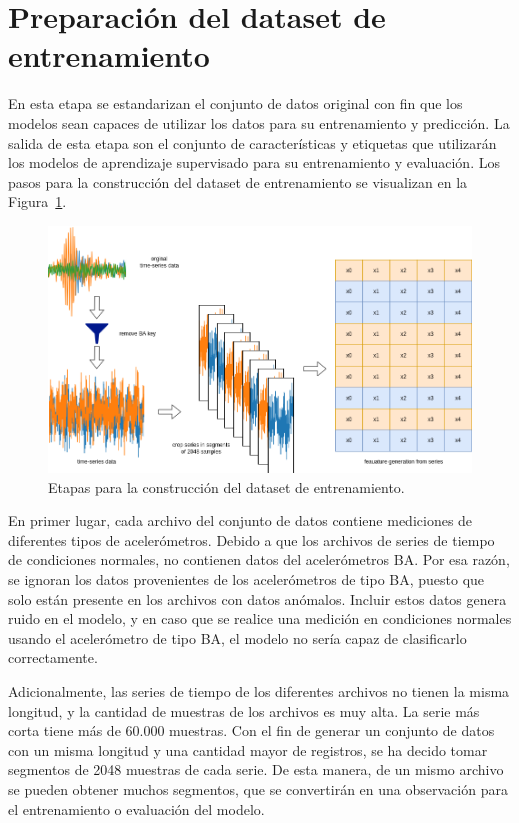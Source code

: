 \documentclass[11pt,a4paper,spanish]{book}
\numberwithin{equation}{chapter}
\numberwithin{figure}{chapter}
\begin{document}
\section{Preparación del dataset de entrenamiento}

En esta etapa se estandarizan el conjunto de datos original con fin que los modelos sean capaces de utilizar los datos para su entrenamiento y predicción. La salida de esta etapa son el conjunto de características y etiquetas que utilizarán los modelos de aprendizaje supervisado para su entrenamiento y evaluación. Los pasos para la construcción del dataset de entrenamiento se visualizan en la Figura~\ref{fig:figGenerationDataset}.


\begin{figure}[h]
    \centering
    \includegraphics[width=1\textwidth]{media/generacion-dataset.drawio.png}
    \caption{Etapas para la construcción del dataset de entrenamiento.}
    \label{fig:figGenerationDataset}
\end{figure}


En primer lugar, cada archivo del conjunto de datos contiene mediciones de diferentes tipos de acelerómetros. Debido a que los archivos de series de tiempo de condiciones normales, no contienen datos del acelerómetros BA. Por esa razón, se ignoran los datos provenientes de los acelerómetros de tipo BA, puesto que solo están presente en los archivos con datos anómalos. Incluir estos datos genera ruido en el modelo, y en caso que se realice una medición en condiciones normales usando el acelerómetro de tipo BA, el modelo no sería capaz de clasificarlo correctamente.


Adicionalmente, las series de tiempo de los diferentes archivos no tienen la misma longitud, y la cantidad de muestras de los archivos es muy alta. La serie más corta tiene más de 60.000 muestras. Con el fin de generar un conjunto de datos con un misma longitud y una cantidad mayor de registros, se ha decido tomar segmentos de 2048 muestras de cada serie.  De esta manera, de un mismo archivo se pueden obtener muchos segmentos, que se convertirán en una observación para el entrenamiento o evaluación del modelo. 
\end{document}
